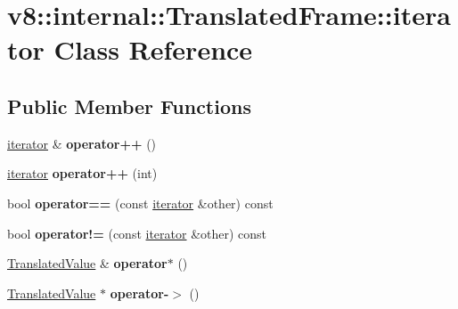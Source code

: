 \hypertarget{classv8_1_1internal_1_1_translated_frame_1_1iterator}{}\section{v8\+:\+:internal\+:\+:Translated\+Frame\+:\+:iterator Class Reference}
\label{classv8_1_1internal_1_1_translated_frame_1_1iterator}
\subsection*{Public Member Functions}
\begin{DoxyCompactItemize}
\item 
\hyperlink{classv8_1_1internal_1_1_translated_frame_1_1iterator}{iterator} \& {\bfseries operator++} ()\hypertarget{classv8_1_1internal_1_1_translated_frame_1_1iterator_ac75b4c563335b3953911c65f8597b1c7}{}\label{classv8_1_1internal_1_1_translated_frame_1_1iterator_ac75b4c563335b3953911c65f8597b1c7}

\item 
\hyperlink{classv8_1_1internal_1_1_translated_frame_1_1iterator}{iterator} {\bfseries operator++} (int)\hypertarget{classv8_1_1internal_1_1_translated_frame_1_1iterator_a84b7e7b8d2bcab583035996e5bb22925}{}\label{classv8_1_1internal_1_1_translated_frame_1_1iterator_a84b7e7b8d2bcab583035996e5bb22925}

\item 
bool {\bfseries operator==} (const \hyperlink{classv8_1_1internal_1_1_translated_frame_1_1iterator}{iterator} \&other) const \hypertarget{classv8_1_1internal_1_1_translated_frame_1_1iterator_afd512a1fb777e31af86faa8195bf0c87}{}\label{classv8_1_1internal_1_1_translated_frame_1_1iterator_afd512a1fb777e31af86faa8195bf0c87}

\item 
bool {\bfseries operator!=} (const \hyperlink{classv8_1_1internal_1_1_translated_frame_1_1iterator}{iterator} \&other) const \hypertarget{classv8_1_1internal_1_1_translated_frame_1_1iterator_ae11e9a9669a26427920958c7ba618875}{}\label{classv8_1_1internal_1_1_translated_frame_1_1iterator_ae11e9a9669a26427920958c7ba618875}

\item 
\hyperlink{classv8_1_1internal_1_1_translated_value}{Translated\+Value} \& {\bfseries operator$\ast$} ()\hypertarget{classv8_1_1internal_1_1_translated_frame_1_1iterator_a048817150b826239d2ea2405feb69757}{}\label{classv8_1_1internal_1_1_translated_frame_1_1iterator_a048817150b826239d2ea2405feb69757}

\item 
\hyperlink{classv8_1_1internal_1_1_translated_value}{Translated\+Value} $\ast$ {\bfseries operator-\/$>$} ()\hypertarget{classv8_1_1internal_1_1_translated_frame_1_1iterator_ad1f854144336e0d2e5a7c41c38ba31f2}{}\label{classv8_1_1internal_1_1_translated_frame_1_1iterator_ad1f854144336e0d2e5a7c41c38ba31f2}

\end{DoxyCompactItemize}
